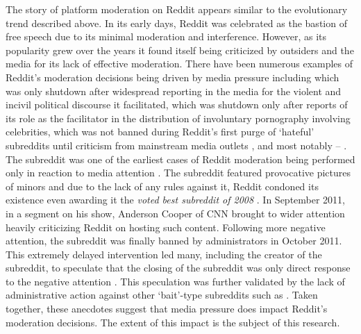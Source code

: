 The story of platform moderation on Reddit appears similar to the evolutionary
trend described above. In its early days, Reddit was celebrated as the bastion
of free speech due to its minimal moderation and interference. However, as its
popularity grew over the years it found itself being criticized by outsiders
and the media for its lack of effective moderation. There have been numerous
examples of Reddit's moderation decisions being driven by media pressure
including  which was only shutdown after widespread
reporting in the media for the violent and incivil political discourse it
facilitated,  which was shutdown only after reports of
its role as the facilitator in the distribution of involuntary pornography
involving celebrities,  which was not banned during
Reddit's first purge of `hateful' subreddits until criticism from mainstream
media outlets \cite{Moyer-WaPo2015}, and most notably -- .
The  subreddit was one of the earliest cases of Reddit
moderation being performed only in reaction to media attention
\cite{centivany2016values}. The subreddit featured provocative pictures of
minors and due to the lack of any rules against it, Reddit condoned its
existence even awarding it the \textit{voted best subreddit of 2008}
\cite{Chen-Jailbait2012}. In September 2011, in a segment on his show,
Anderson Cooper of CNN brought  to wider attention heavily
criticizing Reddit on hosting such content. Following more negative attention,
the subreddit was finally banned by administrators in October 2011. This
extremely delayed intervention led many, including the creator of the
subreddit, to speculate that the closing of the subreddit was only direct
response to the negative attention \cite{Tufekci-CITP2012}.
This speculation was further validated by the lack of administrative action
against other `bait'-type subreddits such as . Taken
together, these anecdotes suggest that media pressure does impact Reddit's
moderation decisions. The extent of this impact is the subject of this
research.


